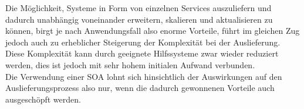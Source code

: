 Die Möglichkeit, Systeme in Form von einzelnen Services auszuliefern und dadurch unabhängig voneinander erweitern, skalieren und aktualisieren zu können, birgt je nach Anwendungsfall also enorme Vorteile, führt im gleichen Zug jedoch auch zu erheblicher Steigerung der Komplexität bei der Auslieferung. Diese Komplexität kann durch geeignete Hilfssysteme zwar wieder reduziert werden, dies ist jedoch mit sehr hohem initialen Aufwand verbunden.\\
Die Verwendung einer SOA lohnt sich hinsichtlich der Auswirkungen auf den Auslieferungsprozess also nur, wenn die dadurch gewonnenen Vorteile auch ausgeschöpft werden.